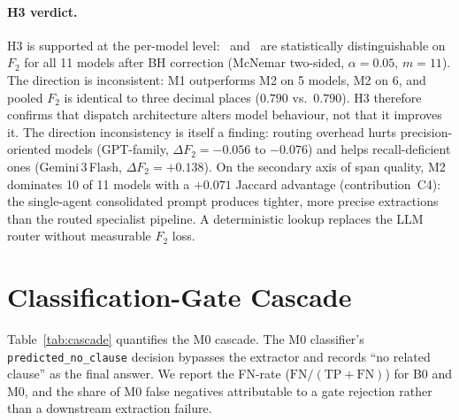 \paragraph{H3 verdict.}
H3 is supported at the per-model level: \cfgMA\ and \cfgCP\ are statistically
distinguishable on $F_2$ for all 11 models after BH correction (McNemar
two-sided, $\alpha{=}0.05$, $m{=}11$). The direction is inconsistent: M1
outperforms M2 on 5 models, M2 on 6, and pooled $F_2$
is identical to three decimal places ($0.790$ vs.\ $0.790$). H3 therefore
confirms that dispatch architecture alters model behaviour, not that it
improves it. The direction inconsistency is itself a finding: routing overhead
hurts precision-oriented models (GPT-family, $\Delta F_2 {=} -0.056$ to
$-0.076$) and helps recall-deficient ones (Gemini\,3\,Flash,
$\Delta F_2 {=} +0.138$). On the secondary axis of span quality, M2 dominates
10 of 11 models with a $+0.071$ Jaccard advantage (contribution~C4): the
single-agent consolidated prompt produces tighter, more precise extractions
than the routed specialist pipeline. A deterministic lookup replaces the LLM
router without measurable $F_2$ loss.

\section{Classification-Gate Cascade}\label{sec:res:cascade}

Table~\ref{tab:cascade} quantifies the M0 cascade. The M0 classifier's
\texttt{predicted\_no\_clause} decision bypasses the extractor and records ``no
related clause'' as the final answer. We report the FN-rate
($\mathrm{FN}/(\mathrm{TP}+\mathrm{FN})$) for B0 and M0, and the share of M0
false negatives attributable to a gate rejection rather than a downstream
extraction failure.

